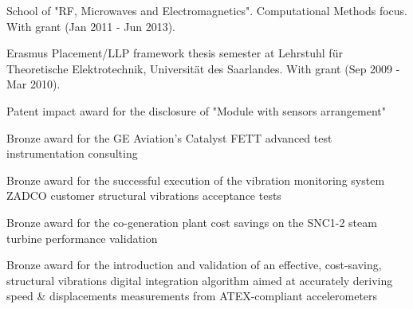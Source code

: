 \documentclass[9pt,a4paper,ragged2e,withhyper]{altacv} %
\begin{document}
\begin{paracol}{2}

\switchcolumn

School of "RF, Microwaves and Electromagnetics". Computational Methods focus. With grant (Jan 2011 - Jun 2013).

\divider

Erasmus Placement/LLP framework thesis semester at Lehrstuhl f\"ur Theoretische Elektrotechnik, Universit\"at des Saarlandes.
With grant (Sep 2009 - Mar 2010).

\divider



\divider

{Patent impact award for the disclosure of "Module with sensors arrangement"}
\divider

{Bronze award for the GE Aviation's Catalyst FETT advanced test instrumentation consulting}
\divider

{Bronze award for the successful execution of the vibration monitoring system ZADCO customer structural vibrations acceptance tests}
\divider

{Bronze award for the co-generation plant cost savings on the SNC1-2 steam turbine performance validation}
\divider

{Bronze award for the introduction and validation of an effective, cost-saving, structural vibrations digital integration algorithm aimed at accurately deriving speed \& displacements measurements from ATEX-compliant accelerometers}
\divider


\end{paracol}
\end{document}
